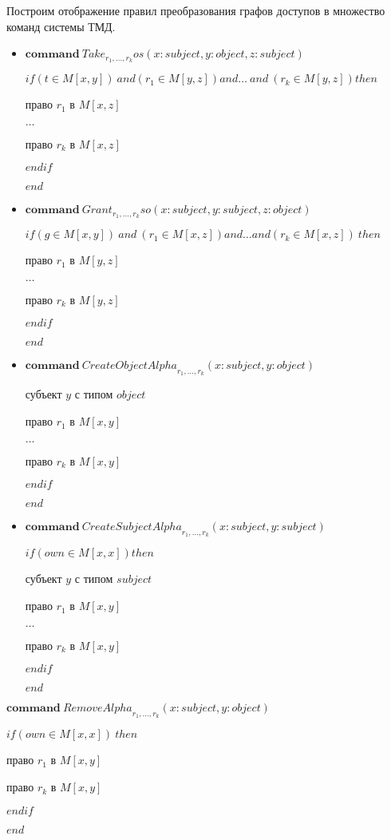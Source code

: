 	Построим отображение правил преобразования графов доступов в множество команд системы ТМД.
\begin{multicols}{2}
	\begin{itemize}
		\item 	$\mathbf{command} \ \mathit{Take}_{r_1, \ldots, r_k}os(x: subject,y:object,z:subject)$

			$if (t \in M[x,y]) \ and (r_1 \in M[y,z])and  \ldots \ and \ (r_k \in M[y,z]) then $

			 право $r_1$ в $M[x,z]$

			$\ldots$

			 право $r_k$ в $M[x,z]$

			$endif$

			$end$

			\item $\mathbf{command} \  \mathit{Grant}_{r_1, \ldots, r_k}so(x: subject,y:subject,z:object)$

			$if (g \in M[x,y]) \ and  \ (r_1 \in M[x,z]) and  \ldots and (r_k \in M[x,z]) \ then $

			 право $r_1$ в $M[y,z]$

			$\ldots$

			 право $r_k$ в $M[y,z]$

			$endif$

			$end$
	\end{itemize}

	\begin{itemize}
		\item 		$\mathbf{command} \  \mathit{CreateObjectAlpha}_{r_1, \ldots, r_k}(x: subject,y:object)$


				 субъект $y$ с типом $object$

				 право $r_1$ в $M[x,y]$

				$\ldots$

				 право $r_k$ в $M[x,y]$

				$endif$

				$end$
				\item		$\mathbf{command} \ \mathit{CreateSubjectAlpha}_{r_1, \ldots, r_k}(x: subject,y:subject)$

						$if (own \in M[x,x]) then $

						 субъект $y$ с типом $subject$

						 право $r_1$ в $M[x,y]$

						$\ldots$

						 право $r_k$ в $M[x,y]$

						$endif$

						$end$
	\end{itemize}
\end{multicols}


		$\mathbf{command} \ \mathit{RemoveAlpha}_{r_1, \ldots, r_k}(x: subject,y:object)$

		$if (own \in M[x,x]) \ then $

		 право $r_1$ в $M[x,y]$

		 право $r_k$ в $M[x,y]$

		$endif$

		$end$
\newpage
